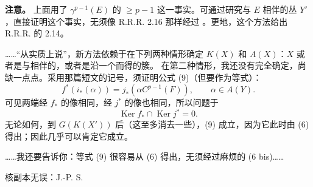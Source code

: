 \textbf{注意。} 上面用了 $\gamma^{p-1}(E)$ 的 $\geq p-1$ 这一事实。可通过研究与 $E$ 相伴的丛 $Y'$，直接证明这个事实，无须像 R.R.R. 2.16 那样经过 。更地，这个方法给出 R.R.R. 的 2.14。

……“从实质上说”，新方法依赖于在下列两种情形确定 $K(X)$ 和 $A(X)$：$X$ 或者是与相伴的，或者是沿一个而得的簇。
在第二种情形，我还没有完全确定，尚缺一点点。采用那篇短文的记号，须证明公式 (9)（但要作为等式）：
\[
f^*(i_*(\alpha))=j_*(\alpha C^{p-1}(F)),\qquad\alpha\in A(Y).\tag{9}
\]
可见两端经 $f_*$ 的像相同，经 $j^*$ 的像也相同，所以问题于
\[
\operatorname{Ker}f_*\cap\operatorname{Ker}j^*=0.\tag{9 bis}
\]
无论如何，到 $G(K(X'))$ 后（这至多消去一些），(9) 成立，因为它此时由 (6) 得出；因此几乎可以肯定它成立。

……我还要告诉你：等式 (9) 很容易从 (6) 得出，无须经过麻烦的 (6 bis)……

\begin{flushright}核副本无误：J.-P. S.\end{flushright}
